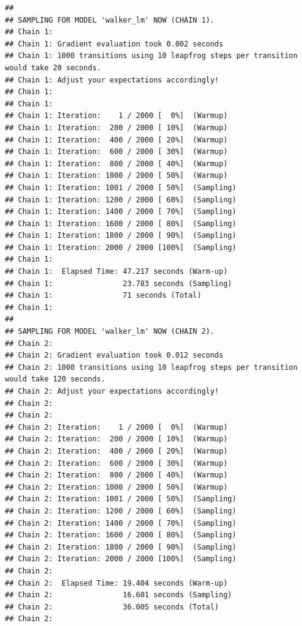 \documentclass[
]{book}
\newenvironment{Shaded}{\begin{snugshade}}{\end{snugshade}}
\newcommand{\AttributeTok}[1]{\textcolor[rgb]{0.77,0.63,0.00}{#1}}
\newcommand{\CommentTok}[1]{\textcolor[rgb]{0.56,0.35,0.01}{\textit{#1}}}
\newcommand{\DecValTok}[1]{\textcolor[rgb]{0.00,0.00,0.81}{#1}}
\newcommand{\FloatTok}[1]{\textcolor[rgb]{0.00,0.00,0.81}{#1}}
\newcommand{\FunctionTok}[1]{\textcolor[rgb]{0.00,0.00,0.00}{#1}}
\newcommand{\NormalTok}[1]{#1}
\newcommand{\SpecialCharTok}[1]{\textcolor[rgb]{0.00,0.00,0.00}{#1}}
\newcommand{\StringTok}[1]{\textcolor[rgb]{0.31,0.60,0.02}{#1}}
\begin{document}
\begin{verbatim}
## 
## SAMPLING FOR MODEL 'walker_lm' NOW (CHAIN 1).
## Chain 1: 
## Chain 1: Gradient evaluation took 0.002 seconds
## Chain 1: 1000 transitions using 10 leapfrog steps per transition would take 20 seconds.
## Chain 1: Adjust your expectations accordingly!
## Chain 1: 
## Chain 1: 
## Chain 1: Iteration:    1 / 2000 [  0%]  (Warmup)
## Chain 1: Iteration:  200 / 2000 [ 10%]  (Warmup)
## Chain 1: Iteration:  400 / 2000 [ 20%]  (Warmup)
## Chain 1: Iteration:  600 / 2000 [ 30%]  (Warmup)
## Chain 1: Iteration:  800 / 2000 [ 40%]  (Warmup)
## Chain 1: Iteration: 1000 / 2000 [ 50%]  (Warmup)
## Chain 1: Iteration: 1001 / 2000 [ 50%]  (Sampling)
## Chain 1: Iteration: 1200 / 2000 [ 60%]  (Sampling)
## Chain 1: Iteration: 1400 / 2000 [ 70%]  (Sampling)
## Chain 1: Iteration: 1600 / 2000 [ 80%]  (Sampling)
## Chain 1: Iteration: 1800 / 2000 [ 90%]  (Sampling)
## Chain 1: Iteration: 2000 / 2000 [100%]  (Sampling)
## Chain 1: 
## Chain 1:  Elapsed Time: 47.217 seconds (Warm-up)
## Chain 1:                23.783 seconds (Sampling)
## Chain 1:                71 seconds (Total)
## Chain 1: 
## 
## SAMPLING FOR MODEL 'walker_lm' NOW (CHAIN 2).
## Chain 2: 
## Chain 2: Gradient evaluation took 0.012 seconds
## Chain 2: 1000 transitions using 10 leapfrog steps per transition would take 120 seconds.
## Chain 2: Adjust your expectations accordingly!
## Chain 2: 
## Chain 2: 
## Chain 2: Iteration:    1 / 2000 [  0%]  (Warmup)
## Chain 2: Iteration:  200 / 2000 [ 10%]  (Warmup)
## Chain 2: Iteration:  400 / 2000 [ 20%]  (Warmup)
## Chain 2: Iteration:  600 / 2000 [ 30%]  (Warmup)
## Chain 2: Iteration:  800 / 2000 [ 40%]  (Warmup)
## Chain 2: Iteration: 1000 / 2000 [ 50%]  (Warmup)
## Chain 2: Iteration: 1001 / 2000 [ 50%]  (Sampling)
## Chain 2: Iteration: 1200 / 2000 [ 60%]  (Sampling)
## Chain 2: Iteration: 1400 / 2000 [ 70%]  (Sampling)
## Chain 2: Iteration: 1600 / 2000 [ 80%]  (Sampling)
## Chain 2: Iteration: 1800 / 2000 [ 90%]  (Sampling)
## Chain 2: Iteration: 2000 / 2000 [100%]  (Sampling)
## Chain 2: 
## Chain 2:  Elapsed Time: 19.404 seconds (Warm-up)
## Chain 2:                16.601 seconds (Sampling)
## Chain 2:                36.005 seconds (Total)
## Chain 2:
\end{verbatim}

\begin{Shaded}
\end{Shaded}
\end{document}
